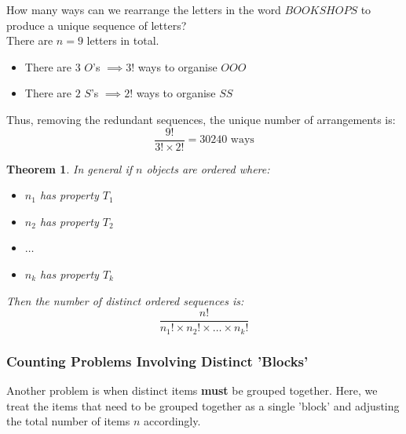 \documentclass[12pt]{article}
\newtheorem{theorem}{Theorem}
\theoremstyle{definition}
\begin{document}
    \begin{example}
        How many ways can we rearrange the letters in the word $BOOKSHOPS$ to produce a unique sequence of letters? \\

        There are $n = 9$ letters in total.
        \begin{itemize}
            \item There are $3$ $O$'s $\implies 3!$ ways to organise $OOO$
            \item There are $2$ $S$'s $\implies 2!$ ways to organise $SS$
        \end{itemize}
        Thus, removing the redundant sequences, the unique number of arrangements is:
        \begin{equation*}
            \frac{9!}{3!\times2!} = 30240 \text{ ways}
        \end{equation*}
    \end{example}
    \vspace{20px}

    \begin{theorem}
        In general if $n$ objects are ordered where:
        \begin{itemize}
            \item $n_1$ has property $T_1$
            \item $n_2$ has property $T_2$
            \item $\dots$
            \item $n_k$ has property $T_k$
        \end{itemize}
        Then the number of distinct ordered sequences is:
        \begin{equation*}
            \frac{n!}{n_1!\times n_2! \times \dots \times n_k!}
        \end{equation*}
    \end{theorem}

    \subsubsection{Counting Problems Involving Distinct 'Blocks'}
    Another problem is when distinct items \textbf{must} be grouped together. Here, we treat the items that need to be
    grouped together as a single 'block' and adjusting the total number of items $n$ accordingly.
\end{document}
